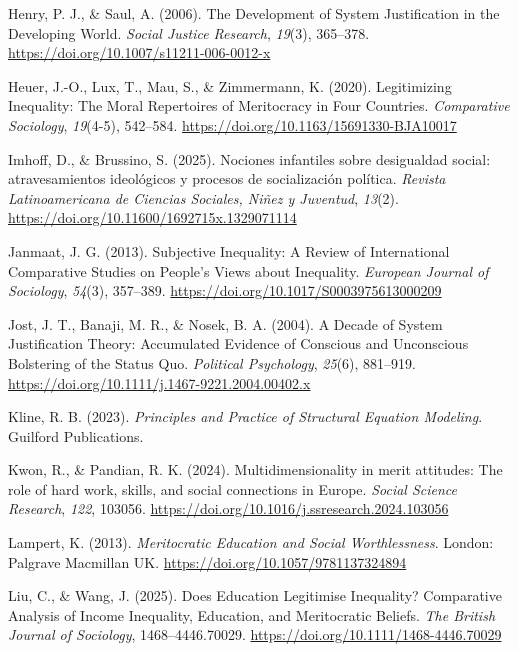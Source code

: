\documentclass[
  13pt,
]{article}
\newlength{\cslhangindent}
\newenvironment{CSLReferences}[2] %
 {\begin{list}{}{%
  \setlength{\itemindent}{0pt}
  \setlength{\leftmargin}{0pt}
  \setlength{\parsep}{0pt}
  \ifodd #1
   \setlength{\leftmargin}{\cslhangindent}
   \setlength{\itemindent}{-1\cslhangindent}
  \fi
  \setlength{\itemsep}{#2\baselineskip}}}
 {\end{list}}
\begin{document}
\begin{CSLReferences}{1}{0}
Henry, P. J., \& Saul, A. (2006). The {Development} of {System
Justification} in the {Developing World}. \emph{Social Justice
Research}, \emph{19}(3), 365--378.
\url{https://doi.org/10.1007/s11211-006-0012-x}

Heuer, J.-O., Lux, T., Mau, S., \& Zimmermann, K. (2020). Legitimizing
{Inequality}: {The Moral Repertoires} of {Meritocracy} in {Four
Countries}. \emph{Comparative Sociology}, \emph{19}(4-5), 542--584.
\url{https://doi.org/10.1163/15691330-BJA10017}

Imhoff, D., \& Brussino, S. (2025). {Nociones infantiles sobre
desigualdad social: atravesamientos ideológicos y procesos de
socialización política}. \emph{Revista Latinoamericana de Ciencias
Sociales, Niñez y Juventud}, \emph{13}(2).
\url{https://doi.org/10.11600/1692715x.1329071114}

Janmaat, J. G. (2013). Subjective {Inequality}: A {Review} of
{International Comparative Studies} on {People}'s {Views} about
{Inequality}. \emph{European Journal of Sociology}, \emph{54}(3),
357--389. \url{https://doi.org/10.1017/S0003975613000209}

Jost, J. T., Banaji, M. R., \& Nosek, B. A. (2004). A {Decade} of
{System Justification Theory}: {Accumulated Evidence} of {Conscious} and
{Unconscious Bolstering} of the {Status Quo}. \emph{Political
Psychology}, \emph{25}(6), 881--919.
\url{https://doi.org/10.1111/j.1467-9221.2004.00402.x}

Kline, R. B. (2023). \emph{Principles and {Practice} of {Structural
Equation Modeling}}. Guilford Publications.

Kwon, R., \& Pandian, R. K. (2024). Multidimensionality in merit
attitudes: {The} role of hard work, skills, and social connections in
{Europe}. \emph{Social Science Research}, \emph{122}, 103056.
\url{https://doi.org/10.1016/j.ssresearch.2024.103056}

Lampert, K. (2013). \emph{Meritocratic {Education} and {Social
Worthlessness}}. London: Palgrave Macmillan UK.
\url{https://doi.org/10.1057/9781137324894}

Liu, C., \& Wang, J. (2025). Does {Education Legitimise Inequality}?
{Comparative Analysis} of {Income Inequality}, {Education}, and
{Meritocratic Beliefs}. \emph{The British Journal of Sociology},
1468--4446.70029. \url{https://doi.org/10.1111/1468-4446.70029}


\end{CSLReferences}
\end{document}

